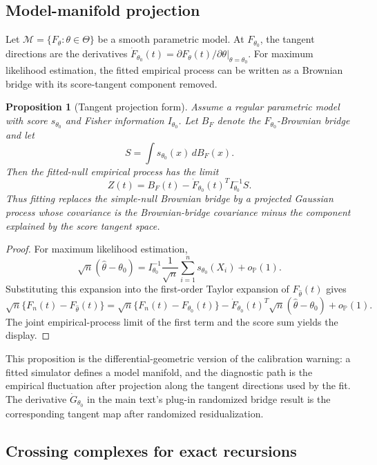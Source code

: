 \documentclass[12pt]{article}
\newtheorem{proposition}[theorem]{Proposition}
\theoremstyle{remark}
\begin{document}
\subsection{Model-manifold projection}

Let $\mathcal{M}=\{F_\theta:\theta\in\Theta\}$ be a smooth parametric model.
At $F_{\theta_0}$, the tangent directions are the derivatives
$\dot F_{\theta_0}(t)=\partial F_\theta(t)/\partial\theta|_{\theta=\theta_0}$.
For maximum likelihood estimation, the fitted empirical process can be written
as a Brownian bridge with its score-tangent component removed.

\begin{proposition}[Tangent projection form]
\label{prop:tangent-projection}
Assume a regular parametric model with score $s_{\theta_0}$ and Fisher
information $I_{\theta_0}$. Let $B_{F}$ denote the $F_{\theta_0}$-Brownian
bridge and let
\[
S=\int s_{\theta_0}(x)\,dB_F(x).
\]
Then the fitted-null empirical process has the limit
\[
Z(t)=B_F(t)-\dot F_{\theta_0}(t)^T I_{\theta_0}^{-1}S.
\]
Thus fitting replaces the simple-null Brownian bridge by a projected Gaussian
process whose covariance is the Brownian-bridge covariance minus the component
explained by the score tangent space.
\end{proposition}

\begin{proof}
For maximum likelihood estimation,
\[
\sqrt n(\widehat\theta-\theta_0)
=I_{\theta_0}^{-1}\frac{1}{\sqrt n}
\sum_{i=1}^n s_{\theta_0}(X_i)+o_{\mathbb P}(1).
\]
Substituting this expansion into the first-order Taylor expansion of
$F_{\widehat\theta}(t)$ gives
\[
\sqrt n\{F_n(t)-F_{\widehat\theta}(t)\}
=\sqrt n\{F_n(t)-F_{\theta_0}(t)\}
-\dot F_{\theta_0}(t)^T\sqrt n(\widehat\theta-\theta_0)+o_{\mathbb P}(1).
\]
The joint empirical-process limit of the first term and the score sum yields
the display.
\end{proof}

This proposition is the differential-geometric version of the calibration
warning: a fitted simulator defines a model manifold, and the diagnostic path is
the empirical fluctuation after projection along the tangent directions used by
the fit. The derivative $\dot G_{\theta_0}$ in the main text's plug-in
randomized bridge result is the corresponding tangent map after randomized
residualization.

\subsection{Crossing complexes for exact recursions}
\end{document}
